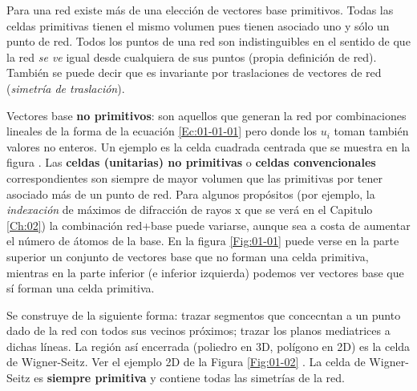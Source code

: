 Para una red existe más de una elección de vectores base primitivos. Todas las celdas primitivas tienen el mismo volumen pues tienen asociado uno y sólo un punto de red. Todos los puntos de una red son indistinguibles en el sentido de que la red {\it se ve} igual desde cualquiera de sus puntos (propia definición de red). También se puede decir que es invariante por traslaciones de vectores de red (\textit{simetría de traslación}). 

\begin{definition}
    Vectores base {\bf no primitivos}: son aquellos que generan la red por combinaciones lineales de la forma de la ecuación \ref{Ec:01-01-01} pero donde los $u_i$ toman también valores no enteros. Un ejemplo es la celda cuadrada centrada que se muestra en la figura . Las \textbf{celdas (unitarias) no primitivas} o \textbf{celdas convencionales} correspondientes son siempre de mayor volumen que las primitivas por tener asociado más de un punto de red. Para algunos propósitos (por ejemplo, la {\it indexación} de máximos de difracción de rayos x que se verá en el Capitulo \ref{Ch:02}) la combinación red+base puede variarse, aunque sea a costa de aumentar el número de átomos de la base. En la figura \ref{Fig:01-01} puede verse en la parte superior un conjunto de vectores base que no forman una celda primitiva, mientras en la parte inferior (e inferior izquierda) podemos ver vectores base que sí forman una celda primitiva.
\end{definition}

\begin{definition}
Se construye de la siguiente forma: trazar segmentos que concecntan a un punto dado de la red con todos sus vecinos próximos; trazar los planos mediatrices a dichas líneas. La región así encerrada (poliedro en 3D, polígono en 2D) es la celda de Wigner-Seitz. Ver el ejemplo 2D de la Figura \ref{Fig:01-02} . La celda de Wigner-Seitz es \textbf{siempre primitiva} y contiene todas las simetrías de la red.    
\end{definition}


